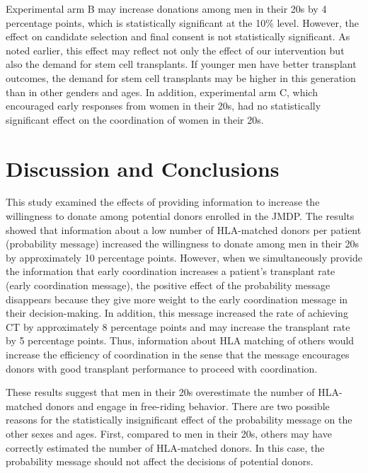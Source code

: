 \documentclass[12pt, a4paper]{article}
\begin{document}
Experimental arm B may increase donations among men in their 20s by 4 percentage points, which is statistically significant at the 10\% level. However, the effect on candidate selection and final consent is not statistically significant. As noted earlier, this effect may reflect not only the effect of our intervention but also the demand for stem cell transplants. If younger men have better transplant outcomes, the demand for stem cell transplants may be higher in this generation than in other genders and ages. In addition, experimental arm C, which encouraged early responses from women in their 20s, had no statistically significant effect on the coordination of women in their 20s.

\hypertarget{conclusion}{%
\section{Discussion and Conclusions}\label{conclusion}}

This study examined the effects of providing information to increase the willingness to donate among potential donors enrolled in the JMDP. The results showed that information about a low number of HLA-matched donors per patient (probability message) increased the willingness to donate among men in their 20s by approximately 10 percentage points. However, when we simultaneously provide the information that early coordination increases a patient's transplant rate (early coordination message), the positive effect of the probability message disappears because they give more weight to the early coordination message in their decision-making. In addition, this message increased the rate of achieving CT by approximately 8 percentage points and may increase the transplant rate by 5 percentage points. Thus, information about HLA matching of others would increase the efficiency of coordination in the sense that the message encourages donors with good transplant performance to proceed with coordination.

These results suggest that men in their 20s overestimate the number of HLA-matched donors and engage in free-riding behavior. There are two possible reasons for the statistically insignificant effect of the probability message on the other sexes and ages. First, compared to men in their 20s, others may have correctly estimated the number of HLA-matched donors. In this case, the probability message should not affect the decisions of potential donors.
\end{document}
